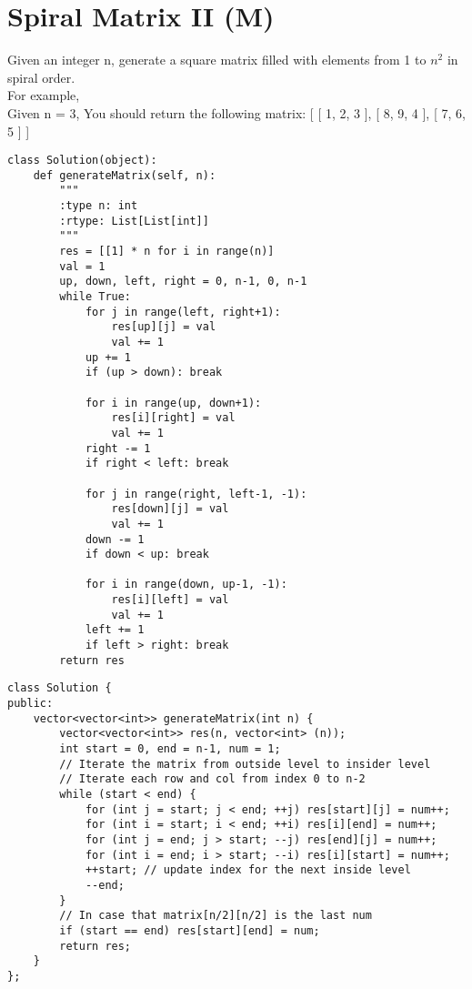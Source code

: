\section{Spiral Matrix II (M)}
Given an integer n, generate a square matrix filled with elements from 1 to $n^2$ in spiral order.\\

For example,\\
Given n = 3,
You should return the following matrix:
[
 [ 1, 2, 3 ],
 [ 8, 9, 4 ],
 [ 7, 6, 5 ]
]\\

\begin{lstlisting}
class Solution(object):
    def generateMatrix(self, n):
        """
        :type n: int
        :rtype: List[List[int]]
        """
        res = [[1] * n for i in range(n)]
        val = 1
        up, down, left, right = 0, n-1, 0, n-1
        while True:
            for j in range(left, right+1):
                res[up][j] = val
                val += 1
            up += 1
            if (up > down): break
                
            for i in range(up, down+1):
                res[i][right] = val
                val += 1
            right -= 1
            if right < left: break
                
            for j in range(right, left-1, -1):
                res[down][j] = val
                val += 1
            down -= 1
            if down < up: break
                
            for i in range(down, up-1, -1):
                res[i][left] = val
                val += 1
            left += 1
            if left > right: break
        return res
\end{lstlisting}

\begin{lstlisting}
class Solution {
public:
    vector<vector<int>> generateMatrix(int n) {
        vector<vector<int>> res(n, vector<int> (n));
        int start = 0, end = n-1, num = 1;
        // Iterate the matrix from outside level to insider level
        // Iterate each row and col from index 0 to n-2
        while (start < end) {
            for (int j = start; j < end; ++j) res[start][j] = num++;
            for (int i = start; i < end; ++i) res[i][end] = num++;
            for (int j = end; j > start; --j) res[end][j] = num++;
            for (int i = end; i > start; --i) res[i][start] = num++;
            ++start; // update index for the next inside level
            --end;
        }
        // In case that matrix[n/2][n/2] is the last num
        if (start == end) res[start][end] = num;
        return res;
    }
};
\end{lstlisting}

